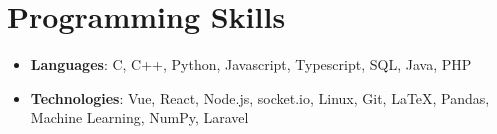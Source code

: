 \documentclass[letterpaper,11pt]{article}
\makeatletter
\newcommand{\resumeSubheading}[4]{
  \vspace{-2pt}\item
    \begin{tabular*}{0.97\textwidth}{l@{\extracolsep{\fill}}r}
      \textbf{#3} & #2 \\
      \textit{\small#1} & \textit{\small #4} \\
    \end{tabular*}\vspace{-5pt}
}
\newcommand{\resumeSubHeadingListStart}{\begin{itemize}[leftmargin=0pt, label={}]}
\newcommand{\resumeSubHeadingListEnd}{\end{itemize}}
\makeatother
\begin{document}
\section{Programming Skills}
 \resumeSubHeadingListStart
   \item
     \textbf{Languages}{: C, C++, Python, Javascript, Typescript, SQL, Java, PHP}
   \item
     \textbf{Technologies}{: Vue, React, Node.js, socket.io, Linux, Git, \LaTeX, Pandas, Machine Learning, NumPy, Laravel}
 \resumeSubHeadingListEnd


\end{document}
